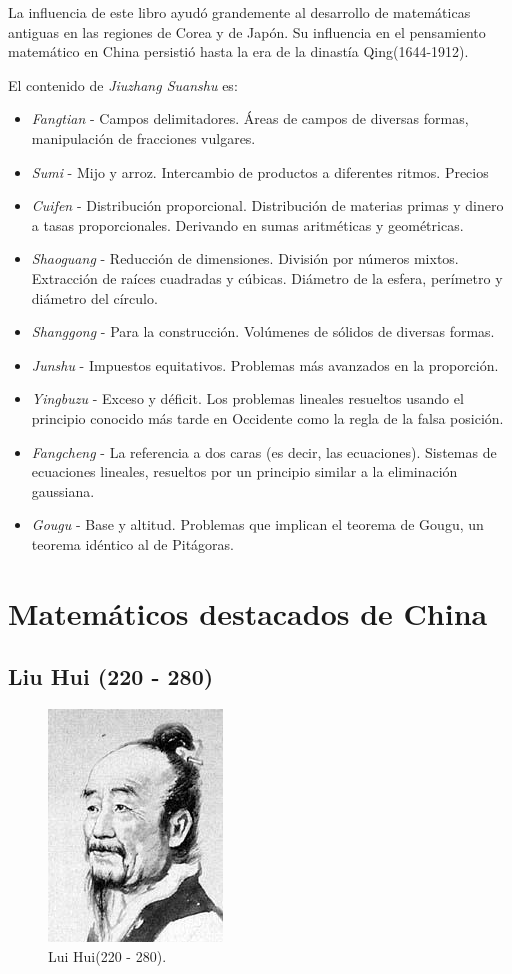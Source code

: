 \documentclass[a4paper, 11pt]{article}
\begin{document}
		La influencia de este libro ayudó grandemente al desarrollo de matemáticas antiguas en las regiones de Corea y de
		Japón. Su influencia en el pensamiento matemático en China persistió hasta la era de la dinastía Qing(1644-1912).
		
		El contenido de \textit{Jiuzhang Suanshu} es:
		\begin{itemize}
			\item \textit{Fangtian} - Campos delimitadores. Áreas de campos de diversas formas, manipulación de fracciones
			vulgares.
			\item \textit{Sumi} - Mijo y arroz. Intercambio de productos a diferentes ritmos. Precios
			\item \textit{Cuifen} - Distribución proporcional. Distribución de materias primas y dinero a tasas proporcionales.
			Derivando en sumas aritméticas y geométricas.
			\item \textit{Shaoguang} - Reducción de dimensiones. División por números mixtos. Extracción de raíces cuadradas
			y cúbicas. Diámetro de la esfera, perímetro y diámetro del círculo.
			\item \textit{Shanggong} - Para la construcción. Volúmenes de sólidos de diversas formas.
			\item \textit{Junshu} - Impuestos equitativos. Problemas más avanzados en la proporción.
			\item \textit{Yingbuzu} - Exceso y déficit. Los problemas lineales resueltos usando el principio conocido más
			tarde en Occidente como la regla de la falsa posición.
			\item \textit{Fangcheng} - La referencia a dos caras (es decir, las ecuaciones). Sistemas de ecuaciones lineales,
			resueltos por un principio similar a la eliminación gaussiana.
			\item \textit{Gougu} - Base y altitud. Problemas que implican el teorema de Gougu, un teorema idéntico al de
			Pitágoras.
		\end{itemize}
		
\newpage
\section{Matemáticos destacados de China}

	\subsection{Liu Hui (220 - 280)}
		\begin{figure}[!ht]
			\centering
			\includegraphics{liu_hui.jpg}
			\caption{Lui Hui(220 - 280).}
			\label{fig:lui_hui}
		\end{figure}
\end{document}
